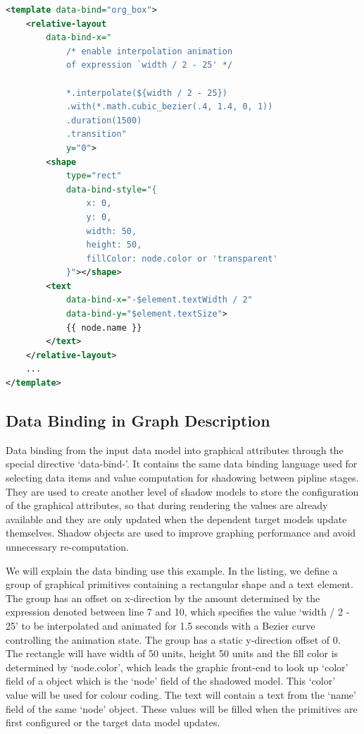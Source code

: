 \documentclass[11pt, a4paper]{report}
\begin{document}
\begin{lstlisting}[language=xml]
<template data-bind="org_box">
	<relative-layout
		data-bind-x="
			/* enable interpolation animation
			of expression `width / 2 - 25' */

			*.interpolate(${width / 2 - 25})
			.with(*.math.cubic_bezier(.4, 1.4, 0, 1))
			.duration(1500)
			.transition"
			y="0">
		<shape
			type="rect"
			data-bind-style="{
				x: 0,
				y: 0,
				width: 50,
				height: 50,
				fillColor: node.color or 'transparent'
			}"></shape>
		<text
			data-bind-x="-$element.textWidth / 2"
			data-bind-y="$element.textSize">
			{{ node.name }}
		</text>
	</relative-layout>
	...
</template>
\end{lstlisting}

\subsection{Data Binding in Graph Description}
Data binding from the input data model into graphical attributes through the special directive `data-bind-'. It contains the same data binding language used for selecting data items and value computation for shadowing between pipline stages. They are used to create another level of shadow models to store the configuration of the graphical attributes, so that during rendering the values are already available and they are only updated when the dependent target models update themselves. Shadow objects are used to improve graphing performance and avoid unnecessary re-computation.

We will explain the data binding use this example. In the listing, we define a group of graphical primitives containing a rectangular shape and a text element. The group has an offset on x-direction by the amount determined by the expression denoted between line 7 and 10, which specifies the value `width / 2 - 25' to be interpolated and animated for 1.5 seconds with a Bezier curve controlling the animation state. The group has a static y-direction offset of 0. The rectangle will have width of 50 units, height 50 units and the fill color is determined by `node.color', which leads the graphic front-end to look up `color' field of a object which is the `node' field of the shadowed model. This `color' value will be used for colour coding. The text will contain a text from the `name' field of the same `node' object. These values will be filled when the primitives are first configured or the target data model updates.
\end{document}
